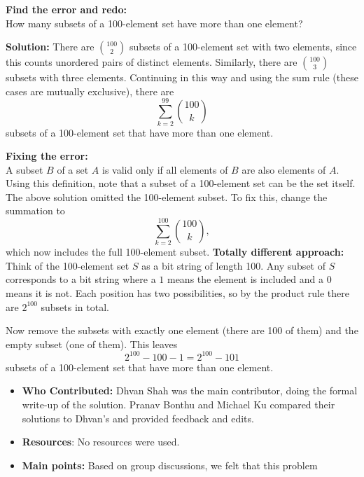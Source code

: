 \documentclass[11pt]{article}
\begin{document}
\textbf{Find the error and redo:}\\
How many subsets of a 100-element set have more than one element?

\textbf{Solution:} There are $\binom{100}{2}$ subsets of a 100-element set with two elements, since this counts unordered pairs of distinct elements. Similarly, there are $\binom{100}{3}$ subsets with three elements. Continuing in this way and using the sum rule (these cases are mutually exclusive), there are
\[
    \sum_{k=2}^{99}\binom{100}{k}
\]
subsets of a 100-element set that have more than one element.

\textbf{Fixing the error:}\\
A subset $B$ of a set $A$ is valid only if all elements of $B$ are also elements of $A$. Using this definition, note that a subset of a 100-element set can be the set itself. The above solution omitted the 100-element subset. To fix this, change the summation to
\[
    \sum_{k=2}^{100}\binom{100}{k},
\]
which now includes the full 100-element subset.
\textbf{Totally different approach:}\\
Think of the 100-element set $S$ as a bit string of length 100. Any subset of $S$ corresponds to a bit string where a $1$ means the element is included and a $0$ means it is not. Each position has two possibilities, so by the product rule there are $2^{100}$ subsets in total.

Now remove the subsets with exactly one element (there are 100 of them) and the empty subset (one of them). This leaves
\[
    2^{100}-100-1=2^{100}-101
\]
subsets of a 100-element set that have more than one element.

\begin{itemize}
    \item \textbf{Who Contributed:} Dhvan Shah was the main contributor, doing the formal write-up of the solution. Pranav Bonthu and Michael Ku compared their solutions to Dhvan’s and provided feedback and edits.
    \item \textbf{Resources}: No resources were used.
    \item \textbf{Main points:} Based on group discussions, we felt that this problem
\end{itemize}
\end{document}
